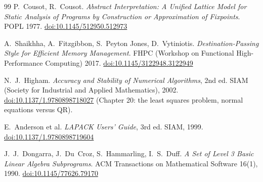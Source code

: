 \begin{thebibliography}{99}
 P.~Cousot, R.~Cousot. \emph{Abstract Interpretation: A
  Unified Lattice Model for Static Analysis of Programs by Construction or
  Approximation of Fixpoints}. POPL 1977.
  \href{https://doi.org/10.1145/512950.512973}{doi:10.1145/512950.512973}

 A.~Shaikhha, A.~Fitzgibbon, S.~Peyton Jones,
  D.~Vytiniotis. \emph{Destination-Passing Style for Efficient Memory
  Management}. FHPC (Workshop on Functional High-Performance Computing)
  2017.
  \href{https://doi.org/10.1145/3122948.3122949}{doi:10.1145/3122948.3122949}

 N.~J.~Higham. \emph{Accuracy and Stability of Numerical
  Algorithms}, 2nd ed. SIAM (Society for Industrial and Applied Mathematics), 2002.
  \href{https://doi.org/10.1137/1.9780898718027}{doi:10.1137/1.9780898718027}
  (Chapter 20: the least squares problem, normal equations versus QR).

 E.~Anderson et al. \emph{LAPACK Users' Guide}, 3rd ed.
  SIAM, 1999.
  \href{https://doi.org/10.1137/1.9780898719604}{doi:10.1137/1.9780898719604}

 J.~J.~Dongarra, J.~Du~Croz, S.~Hammarling, I.~S.~Duff.
  \emph{A Set of Level 3 Basic Linear Algebra Subprograms}. ACM Transactions on Mathematical Software 16(1),
  1990. \href{https://doi.org/10.1145/77626.79170}{doi:10.1145/77626.79170}
\end{thebibliography}
\endgroup
